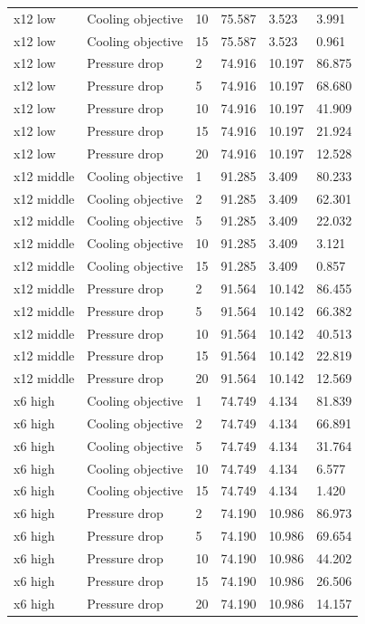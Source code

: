 \begin{longtable}{llllll}
x12 low & Cooling objective & 10 & 75.587 & 3.523 & 3.991\\
x12 low & Cooling objective & 15 & 75.587 & 3.523 & 0.961\\
x12 low & Pressure drop & 2 & 74.916 & 10.197 & 86.875\\
x12 low & Pressure drop & 5 & 74.916 & 10.197 & 68.680\\
x12 low & Pressure drop & 10 & 74.916 & 10.197 & 41.909\\
x12 low & Pressure drop & 15 & 74.916 & 10.197 & 21.924\\
x12 low & Pressure drop & 20 & 74.916 & 10.197 & 12.528\\
x12 middle & Cooling objective & 1 & 91.285 & 3.409 & 80.233\\
x12 middle & Cooling objective & 2 & 91.285 & 3.409 & 62.301\\
x12 middle & Cooling objective & 5 & 91.285 & 3.409 & 22.032\\
x12 middle & Cooling objective & 10 & 91.285 & 3.409 & 3.121\\
x12 middle & Cooling objective & 15 & 91.285 & 3.409 & 0.857\\
x12 middle & Pressure drop & 2 & 91.564 & 10.142 & 86.455\\
x12 middle & Pressure drop & 5 & 91.564 & 10.142 & 66.382\\
x12 middle & Pressure drop & 10 & 91.564 & 10.142 & 40.513\\
x12 middle & Pressure drop & 15 & 91.564 & 10.142 & 22.819\\
x12 middle & Pressure drop & 20 & 91.564 & 10.142 & 12.569\\
x6 high & Cooling objective & 1 & 74.749 & 4.134 & 81.839\\
x6 high & Cooling objective & 2 & 74.749 & 4.134 & 66.891\\
x6 high & Cooling objective & 5 & 74.749 & 4.134 & 31.764\\
x6 high & Cooling objective & 10 & 74.749 & 4.134 & 6.577\\
x6 high & Cooling objective & 15 & 74.749 & 4.134 & 1.420\\
x6 high & Pressure drop & 2 & 74.190 & 10.986 & 86.973\\
x6 high & Pressure drop & 5 & 74.190 & 10.986 & 69.654\\
x6 high & Pressure drop & 10 & 74.190 & 10.986 & 44.202\\
x6 high & Pressure drop & 15 & 74.190 & 10.986 & 26.506\\
x6 high & Pressure drop & 20 & 74.190 & 10.986 & 14.157\\

\end{longtable}
